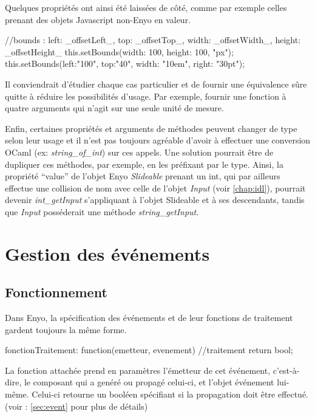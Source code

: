 \documentclass[11pt,a4paper]{report}
\begin{document}
Quelques propriétés ont ainsi été laissées de côté, comme par exemple celles prenant des
objets Javascript non-Enyo en valeur.

\begin{JavaScript}
//bounds : {left: _offsetLeft_, top: _offsetTop_, width: _offsetWidth_, height: _offsetHeight_}
this.setBounds({width: 100, height: 100}, "px");
this.setBounds({left:"100", top:"40", width: "10em", right: "30pt"});
\end{JavaScript}

Il conviendrait d'étudier chaque cas particulier et de fournir une équivalence sûre quitte à
réduire les possibilités d'usage. Par exemple, fournir une fonction à quatre arguments qui
n'agit sur une seule unité de mesure.\medskip

Enfin, certaines propriétés et arguments de méthodes peuvent changer de type selon leur usage 
et il n'est pas toujours agréable d'avoir à effectuer une conversion OCaml (ex: \emph{string\_of\_int})
sur ces appels. Une solution pourrait être de dupliquer ces méthodes, par exemple, en les préfixant 
par le type. Ainsi, la propriété ``value''  de l'objet Enyo \emph{Slideable} prenant un int, qui par ailleurs 
effectue une collision de nom avec celle de l'objet \emph{Input} (voir \ref{chap:idl}), pourrait 
devenir \emph{int\_getInput} s'appliquant à l'objet Slideable et à ses descendants, tandis que \emph{Input}
posséderait une méthode \emph{string\_getInput}.

\section{Gestion des événements}\label{gestevent}
\subsection{Fonctionnement}
Dans Enyo, la spécification des événements et de leur fonctions de traitement gardent toujours la même
forme.

\begin{JavaScript}
  fonctionTraitement: function(emetteur, evenement){
                          //traitement
                          return bool; }
\end{JavaScript}

La fonction attachée prend en paramètres l'émetteur de cet événement, c'est-à-dire, 
le composant qui a genéré ou propagé celui-ci, et l'objet événement lui-même.
Celui-ci retourne un booléen spécifiant si la propagation doit être effectué.
(voir : \ref{sec:event} pour plus de détails)
\end{document}
